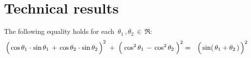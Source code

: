 

\section{Technical results}
\setcounter{theorem}{0}
\setcounter{equation}{0}


\renewcommand{\theenumi}{\roman{enumi}}
\renewcommand{\labelenumi}{\textnormal{(\theenumi)}$\;\;$}


\begin{lemma}\label{trigLemma}
\mbox{}\vskip 0.2cm
\noindent
The following equality holds for each \,$\theta_{1} \,, \theta_{2} \,\in\, \Re$:
	\begin{eqnarray*}
	\left(\,
		\cos\theta_{1}\overset{{\color{white}1}}{\cdot}\sin\theta_{1}
		\, + \,
		\cos\theta_{2}\overset{{\color{white}1}}{\cdot}\sin\theta_{2}
		\,\right)^{2}
		\; + \;
	\left(\; \cos^{2}\theta_{1} \, \overset{{\color{white}.}}{-} \, \cos^{2}\theta_{2} \;\right)^{2}
	& = &
		\left(\,\sin(\,\theta_{1} \overset{{\color{white}.}}{+} \theta_{2}\,) \,\right)^{2}
	\end{eqnarray*}
\end{lemma}
\proof
